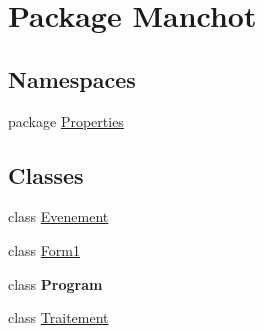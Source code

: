 \hypertarget{namespace_manchot}{\section{Package Manchot}
\label{namespace_manchot}
}
\subsection*{Namespaces}
\begin{DoxyCompactItemize}
\item 
package \hyperlink{namespace_manchot_1_1_properties}{Properties}
\end{DoxyCompactItemize}
\subsection*{Classes}
\begin{DoxyCompactItemize}
\item 
class \hyperlink{class_manchot_1_1_evenement}{Evenement}
\item 
class \hyperlink{class_manchot_1_1_form1}{Form1}
\item 
class {\bfseries Program}
\item 
class \hyperlink{class_manchot_1_1_traitement}{Traitement}
\end{DoxyCompactItemize}
